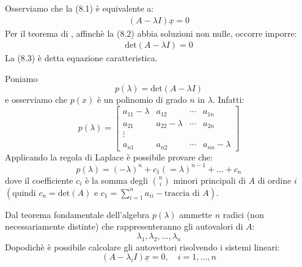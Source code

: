 \documentclass[12pt]{report}
\newcommand{\namerefl}[1]{%
	\bgroup
	\let\nmu\MakeLowercase
	\nameref{#1}\egroup}
\newcommand{\nmu}{}
\begin{document}
Osserviamo che la (8.1) è equivalente a:
\begin{align}
	(A - \lambda I)\underline{x} = 0
\end{align}
Per il teorema di \namerefl{th:rouche_capelli}, affinchè la (8.2) abbia soluzioni non nulle, occorre imporre:
\begin{align}
	\text{det}(A -\lambda I) = 0
\end{align}
La (8.3) è detta equazione caratteristica.

Poniamo
\[
p(\lambda) = \text{det}(A - \lambda I)
\]
e osserviamo che $p(x)$ è un polinomio di grado $n$ in $\lambda$.
Infatti:
\[
p(\lambda) = \begin{bmatrix}
	a_{11} - \lambda & a_{12} & \cdots & a_{1n} \\
	a_{21} & a_{22} - \lambda & \cdots & a_{2n} \\
	\vdots \\
	a_{n1} & a_{n2} & \cdots & a_{nn} - \lambda
\end{bmatrix}
\]
Applicando la regola di Laplace è possibile provare che:
\[
p(\lambda) = (-\lambda)^n + c_1(=\lambda)^{n-1} + \dots + c_n
\]
dove il coefficiente $c_i$ è la somma degli $\binom{n}{i}$ minori principali di $A$ di ordine $i$ $\left(\text{quindi } c_n = \text{det}(A) \text{ e } c_1 = \displaystyle\sum_{i=1}^{n}a_{ii} - \text{traccia di }A\right)$.

Dal teorema fondamentale dell'algebra $p(\lambda)$ ammette $n$ radici (non necessariamente distinte) che rappresenteranno gli autovalori di $A$:
\[
\lambda_1, \lambda_2, \dots, \lambda_n
\]
Dopodichè è possibile calcolare gli autovettori risolvendo i sistemi lineari:
\[
(A - \lambda_i I)\underline{x} = 0, \quad i = 1, \dots, n
\]
\end{document}
